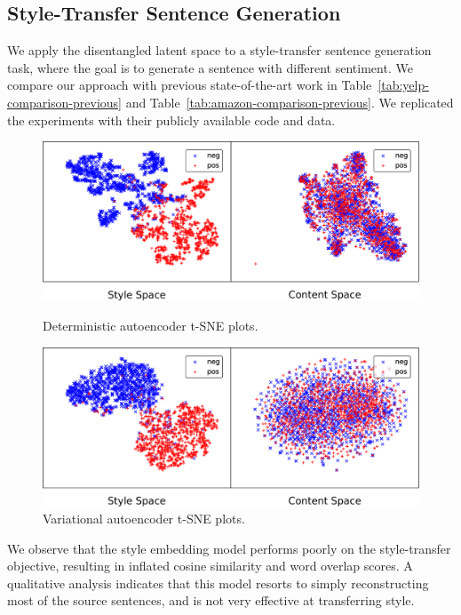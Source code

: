 \documentclass[letterpaper]{article} %
\begin{document}
\subsection{Style-Transfer Sentence Generation}

We apply the disentangled latent space to a style-transfer sentence generation task, where the goal is to generate a sentence with different sentiment.
We compare our approach with previous state-of-the-art work in Table~\ref{tab:yelp-comparison-previous} and Table~\ref{tab:amazon-comparison-previous}.
We replicated the experiments with their publicly available code and data.

\begin{figure}[ht]
	\captionsetup{justification=centering}

	\includegraphics[width=\linewidth]{dae-latent-spaces}
	\caption{Deterministic autoencoder t-SNE plots.}
	\label{fig:dae-tsne}

	\includegraphics[width=\linewidth]{vae-latent-spaces}
	\caption{Variational autoencoder t-SNE plots.}
	\label{fig:vae-tsne}
\end{figure}

We observe that the style embedding model \cite{fu2017style} performs poorly on the style-transfer objective, resulting in inflated cosine similarity and word overlap scores.
A qualitative analysis indicates that this model resorts to simply reconstructing most of the source sentences, and is not very effective at transferring style.
\end{document}
